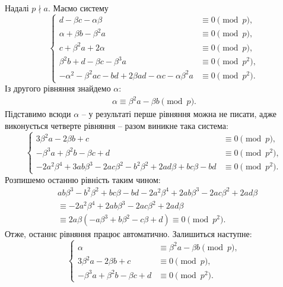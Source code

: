 \documentclass{thesis}
\begin{document}
Надалі $p \nmid a$. Маємо систему
\begin{equation*}
\begin{cases}
d - \beta c - \alpha \beta & \equiv 0 \pmod p, \\
\alpha + \beta b - \beta^2 a & \equiv 0 \pmod p, \\
c +\beta^2 a + 2\alpha & \equiv 0 \pmod p, \\
\beta^2 b + d - \beta c - \beta^3 a & \equiv 0 \pmod {p^2}, \\
-\alpha^2 - \beta^2 ac - bd + 2 \beta a d - \alpha c - \alpha \beta^2 a & \equiv 0 \pmod {p^2}.
\end{cases}
\end{equation*}
Із другого рівняння знайдемо $\alpha$:
\begin{align*}
\alpha \equiv \beta^2 a - \beta b \pmod p.
\end{align*}
Підставимо всюди $\alpha$ -- у результаті перше рівняння можна не писати, адже виконується четверте рівняння -- разом виникне така система:
\begin{equation*}
\begin{cases}
3 \beta^2 a - 2 \beta b + c & \equiv 0 \pmod p, \\
-\beta^3 a + \beta^2 b - \beta c + d & \equiv 0 \pmod {p^2}, \\
-2 a^2 \beta^4 + 3 a b \beta^3 - 2 a c \beta^2 - b^2 \beta^2 + 2 a d \beta + b c \beta - bd & \equiv 0 \pmod {p^2}.
\end{cases}
\end{equation*}
Розпишемо останню рівність таким чином:
\begin{align*}
& ab \beta^3 - b^2 \beta^2 + b c \beta - bd - 2a^2 \beta^4 + 2 ab \beta^3 - 2 ac \beta^2 + 2 ad \beta \\
& \equiv -2a^2 \beta^4 + 2ab \beta^3 - 2 ac\beta^2 + 2 ad \beta \\
& \equiv 2a\beta (-a \beta^3 + b \beta^2 - c \beta + d) \equiv 0 \pmod {p^2}.
\end{align*}
Отже, останнє рівняння працює автоматично. Залишиться наступне:
\begin{equation}
\label{system_of_equations_when_a_nmid_p}
\begin{cases}
\alpha & \equiv \beta^2 a - \beta b \pmod p, \\
3 \beta^2 a - 2 \beta b + c & \equiv 0 \pmod p, \\
-\beta^3 a + \beta^2 b - \beta c + d & \equiv 0 \pmod {p^2}.
\end{cases}
\end{equation}
\end{document}
